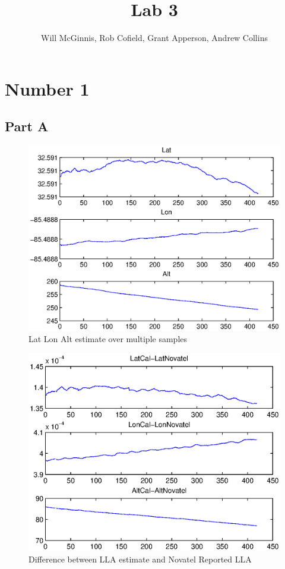\documentclass[11pt]{article} %
\title{Lab 3}
\author{Will McGinnis, Rob Cofield, Grant Apperson, Andrew Collins}
\begin{document}
\maketitle

\section{Number 1}

\subsection{Part A}

\begin{figure}[h!t]
 \centering
    \includegraphics[width=5in]{part1aestimate.eps}
    \caption{Lat Lon Alt estimate over multiple samples}
    \label{estimate}
\end{figure}

\begin{figure}[h!t]
 \centering
    \includegraphics[width=5in]{part1aerror.eps}
    \caption{Difference between LLA estimate and Novatel Reported LLA}
    \label{error}
\end{figure}
\end{document}
